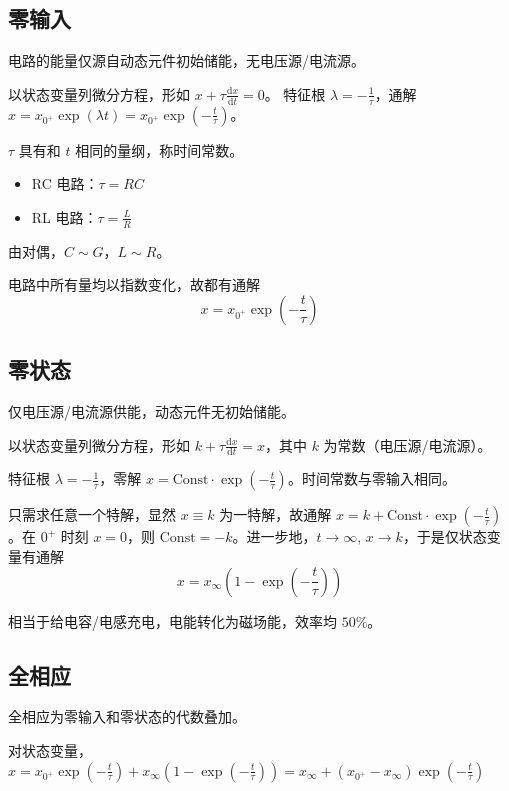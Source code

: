 \documentclass[12pt, a4paper, UTF8, openany]{ctexbook}
\newcommand{\dif}{\mathrm{d}}
\begin{document}
        \subsection{零输入}
        电路的能量仅源自动态元件初始储能，无电压源/电流源。

        以状态变量列微分方程，形如 $x + \tau\frac{\dif x}{\dif t} = 0$。
        特征根 $\lambda = -\frac{1}{\tau}$，通解 $x = x_{0^+}\exp(\lambda t) = x_{0^+}\exp(-\frac{t}{\tau})$。
        
        $\tau$ 具有和 $t$ 相同的量纲，称时间常数。

        \begin{itemize}
            \item RC 电路：$\tau = RC$
            \item RL 电路：$\tau = \frac{L}{R}$
        \end{itemize}
        由对偶，$C \sim G$，$L \sim R$。

        电路中{\heiti 所有量}均以指数变化，故都有通解 $$x = x_{0^+}\exp(-\frac{t}{\tau})$$

        \subsection{零状态}
        仅电压源/电流源供能，动态元件无初始储能。

        以状态变量列微分方程，形如 $k + \tau\frac{\dif x}{\dif t} = x$，其中 $k$ 为常数（电压源/电流源）。
        
        特征根 $\lambda = -\frac{1}{\tau}$，零解 $x = \text{Const} \cdot \exp(-\frac{t}{\tau})$。时间常数与零输入相同。

        只需求任意一个特解，显然 $x \equiv k$ 为一特解，故通解 $x = k + \text{Const} \cdot \exp(-\frac{t}{\tau})$。在 $0^+$ 时刻 $x = 0$，则 $\text{Const} = -k$。进一步地，$t \to \infty, \, x \to k$，于是{\heiti 仅状态变量}有通解 $$x = x_{\infty}(1 - \exp(-\frac{t}{\tau}))$$

        相当于给电容/电感充电，电能转化为磁场能，效率均 $50 \%$。

        \subsection{全相应}
        全相应为零输入和零状态的代数叠加。

        对状态变量，$x = x_{0^+}\exp(-\frac{t}{\tau}) + x_{\infty}(1 - \exp(-\frac{t}{\tau})) = x_{\infty} + (x_{0^+} - x_{\infty})\exp(-\frac{t}{\tau})$
\end{document}

